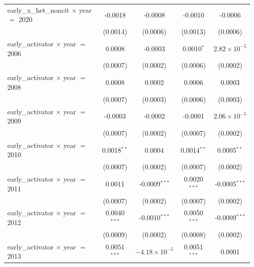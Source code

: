 \begin{tabular}{lcccc}
   early\_x\_het\_noncit $\times$ year $=$ 2020     & -0.0018            & -0.0008                   & -0.0010              & -0.0006\\   
                                                    & (0.0014)           & (0.0006)                  & (0.0013)             & (0.0006)\\   
   early\_activator $\times$ year $=$ 2006          & 0.0008             & -0.0003                   & 0.0010$^{*}$         & $2.82\times 10^{-5}$\\    
                                                    & (0.0007)           & (0.0002)                  & (0.0006)             & (0.0002)\\   
   early\_activator $\times$ year $=$ 2008          & 0.0008             & 0.0002                    & 0.0006               & 0.0003\\   
                                                    & (0.0007)           & (0.0003)                  & (0.0006)             & (0.0003)\\   
   early\_activator $\times$ year $=$ 2009          & -0.0003            & -0.0002                   & -0.0001              & $2.06\times 10^{-5}$\\    
                                                    & (0.0007)           & (0.0002)                  & (0.0007)             & (0.0002)\\   
   early\_activator $\times$ year $=$ 2010          & 0.0018$^{**}$      & 0.0004                    & 0.0014$^{**}$        & 0.0005$^{**}$\\   
                                                    & (0.0007)           & (0.0002)                  & (0.0007)             & (0.0002)\\   
   early\_activator $\times$ year $=$ 2011          & 0.0011             & -0.0009$^{***}$           & 0.0020$^{***}$       & -0.0005$^{***}$\\   
                                                    & (0.0007)           & (0.0002)                  & (0.0007)             & (0.0002)\\   
   early\_activator $\times$ year $=$ 2012          & 0.0040$^{***}$     & -0.0010$^{***}$           & 0.0050$^{***}$       & -0.0009$^{***}$\\   
                                                    & (0.0009)           & (0.0002)                  & (0.0008)             & (0.0002)\\   
   early\_activator $\times$ year $=$ 2013          & 0.0051$^{***}$     & $-4.18\times 10^{-5}$     & 0.0051$^{***}$       & 0.0001\\   

\end{tabular}
